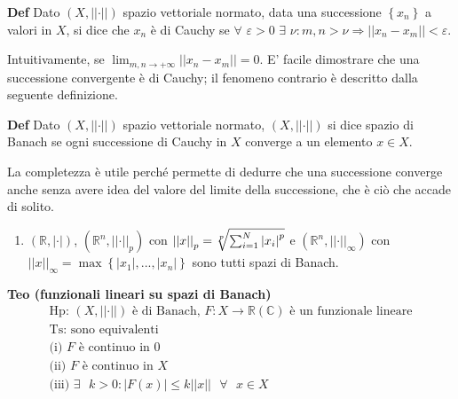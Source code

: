 \documentclass{article}
\begin{document}
\textbf{Def} Dato $\left( X,\left\vert \left\vert \cdot \right\vert
\right\vert \right) $ spazio vettoriale normato, data una successione $%
\left\{ x_{n}\right\} $ a valori in $X$, si dice che $x_{n}$ \`{e} di Cauchy
se $\forall $ $\varepsilon >0$ $\exists $ $\nu :m,n>\nu \Longrightarrow
\left\vert \left\vert x_{n}-x_{m}\right\vert \right\vert <\varepsilon $.

Intuitivamente, se $\lim_{m,n\rightarrow +\infty }\left\vert \left\vert
x_{n}-x_{m}\right\vert \right\vert =0$. E' facile dimostrare che una
successione convergente \`{e} di Cauchy; il fenomeno contrario \`{e}
descritto dalla seguente definizione.

\textbf{Def} Dato $\left( X,\left\vert \left\vert \cdot \right\vert
\right\vert \right) $ spazio vettoriale normato, $\left( X,\left\vert
\left\vert \cdot \right\vert \right\vert \right) $ si dice spazio di Banach
se ogni successione di Cauchy in $X$ converge a un elemento $x\in X$.

La completezza \`{e} utile perch\'{e} permette di dedurre che una
successione converge anche senza avere idea del valore del limite della
successione, che \`{e} ci\`{o} che accade di solito.

\begin{enumerate}
\item $\left( 
\mathbb{R}
,\left\vert \cdot \right\vert \right) $, $\left( 
\mathbb{R}
^{n},\left\vert \left\vert \cdot \right\vert \right\vert _{p}\right) $ con $%
\left\vert \left\vert x\right\vert \right\vert _{p}=\sqrt[p]{%
\sum_{i=1}^{N}\left\vert x_{i}\right\vert ^{p}}$ e $\left( 
\mathbb{R}
^{n},\left\vert \left\vert \cdot \right\vert \right\vert _{\infty }\right) $
con $\left\vert \left\vert x\right\vert \right\vert _{\infty }=\max \left\{
\left\vert x_{1}\right\vert ,...,\left\vert x_{n}\right\vert \right\} $ sono
tutti spazi di Banach.
\end{enumerate}

\textbf{Teo (funzionali lineari su spazi di Banach)} 
\begin{gather*}
\text{Hp: }\left( X,\left\vert \left\vert \cdot \right\vert \right\vert
\right) \text{ \`{e} di Banach, }F:X\rightarrow 
\mathbb{R}
\left( 
\mathbb{C}
\right) \text{ \`{e} un funzionale lineare} \\
\text{Ts: sono equivalenti} \\
\text{(i) }F\text{ \`{e} continuo in }0 \\
\text{(ii) }F\text{ \`{e} continuo in }X \\
\text{(iii) }\exists \text{ }k>0:\left\vert F\left( x\right) \right\vert
\leq k\left\vert \left\vert x\right\vert \right\vert \text{ }\forall \text{ }%
x\in X
\end{gather*}
\end{document}

